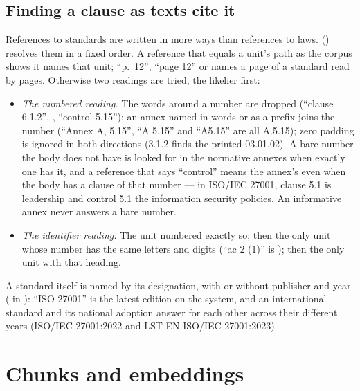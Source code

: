 \subsection{Finding a clause as texts cite it}\label{sec:corpus:clause}

References to standards are written in more ways than references to laws. 
() resolves them in a fixed order. A reference that equals a unit's
path as the corpus shows it names that unit; \enquote{p.~12}, \enquote{page 12} or
 names a page of a standard read by pages. Otherwise two readings are tried, the
likelier first:

\begin{itemize}
  \item \emph{The numbered reading.} The words around a number are dropped
    (\enquote{clause 6.1.2}, , \enquote{control 5.15}); an annex named in
    words or as a prefix joins the number (\enquote{Annex A, 5.15}, \enquote{A 5.15} and
    \enquote{A5.15} are all A.5.15); zero padding is ignored in both directions (3.1.2 finds
    the printed 03.01.02). A bare number the body does not have is looked for in the
    normative annexes when exactly one has it, and a reference that says \enquote{control}
    means the annex's even when the body has a clause of that number --- in ISO/IEC 27001,
    clause 5.1 is leadership and control 5.1 the information security policies. An
    informative annex never answers a bare number.
  \item \emph{The identifier reading.} The unit numbered exactly so; then the only unit whose
    number has the same letters and digits (\enquote{ac 2 (1)} is ); then the
    only unit with that heading.
\end{itemize}

A standard itself is named by its designation, with or without publisher and year
( in ): \enquote{ISO 27001} is the latest
edition on the system, and an international standard and its national adoption answer for
each other across their different years (ISO/IEC 27001:2022 and LST EN ISO/IEC 27001:2023).


\section{Chunks and embeddings}\label{sec:corpus:chunks}

